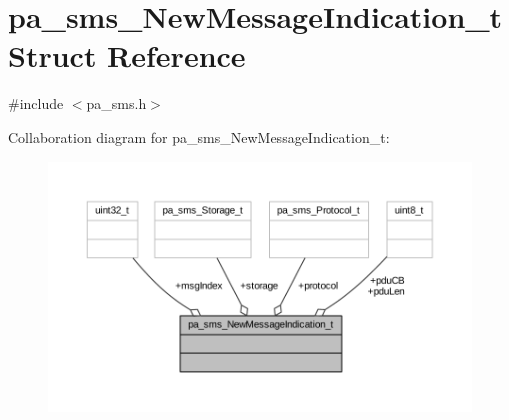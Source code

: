 \hypertarget{structpa__sms___new_message_indication__t}{}\section{pa\+\_\+sms\+\_\+\+New\+Message\+Indication\+\_\+t Struct Reference}
\label{structpa__sms___new_message_indication__t}


{\ttfamily \#include $<$pa\+\_\+sms.\+h$>$}



Collaboration diagram for pa\+\_\+sms\+\_\+\+New\+Message\+Indication\+\_\+t\+:
\nopagebreak
\begin{figure}[H]
\begin{center}
\leavevmode
\includegraphics[width=350pt]{structpa__sms___new_message_indication__t__coll__graph}
\end{center}
\end{figure}
